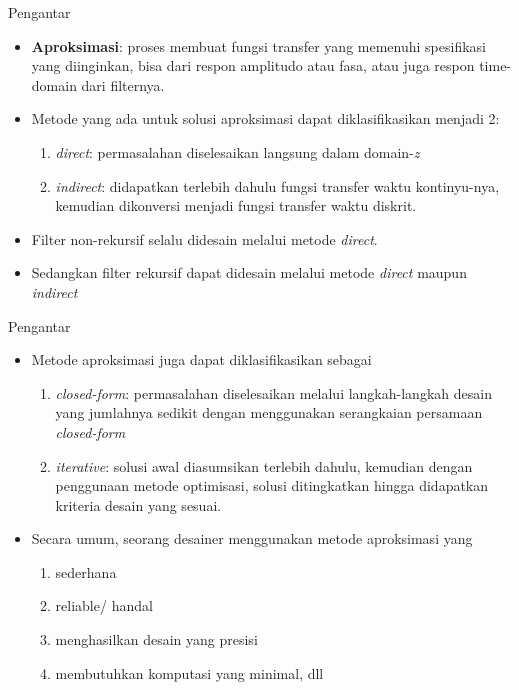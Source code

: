 \documentclass[pdflatex,compress,mathserif]{beamer}
\begin{document}
\begin{frame}{Pengantar}
	\begin{itemize}
		\item \textbf{Aproksimasi}: proses membuat fungsi transfer yang memenuhi spesifikasi yang diinginkan, bisa dari respon amplitudo atau fasa, atau juga respon time-domain dari filternya.
		\item Metode yang ada untuk solusi aproksimasi dapat diklasifikasikan menjadi 2:
		\begin{enumerate}
			\item \textit{direct}: permasalahan diselesaikan langsung dalam domain-\textit{z}
			\item \textit{indirect}: didapatkan terlebih dahulu fungsi transfer waktu kontinyu-nya, kemudian dikonversi menjadi fungsi transfer waktu diskrit.
		\end{enumerate}
		\item Filter non-rekursif selalu didesain melalui metode \textit{direct}.
		\item Sedangkan filter rekursif dapat didesain melalui metode \textit{direct} maupun \textit{indirect}
	\end{itemize}
\end{frame}

\begin{frame}{Pengantar}
	\begin{itemize}
		\item Metode aproksimasi juga dapat diklasifikasikan sebagai
		\begin{enumerate}
			\item \textit{closed-form}: permasalahan diselesaikan melalui langkah-langkah desain yang jumlahnya sedikit dengan menggunakan serangkaian persamaan \textit{closed-form}
			\item \textit{iterative}: solusi awal diasumsikan terlebih dahulu, kemudian dengan penggunaan metode optimisasi, solusi ditingkatkan hingga didapatkan kriteria desain yang sesuai.
		\end{enumerate}
		\item Secara umum, seorang desainer menggunakan metode aproksimasi yang
		\begin{enumerate}
			\item sederhana
			\item reliable/ handal
			\item menghasilkan desain yang presisi
			\item membutuhkan komputasi yang minimal, dll
		\end{enumerate}
	\end{itemize}
\end{frame}
\end{document}
